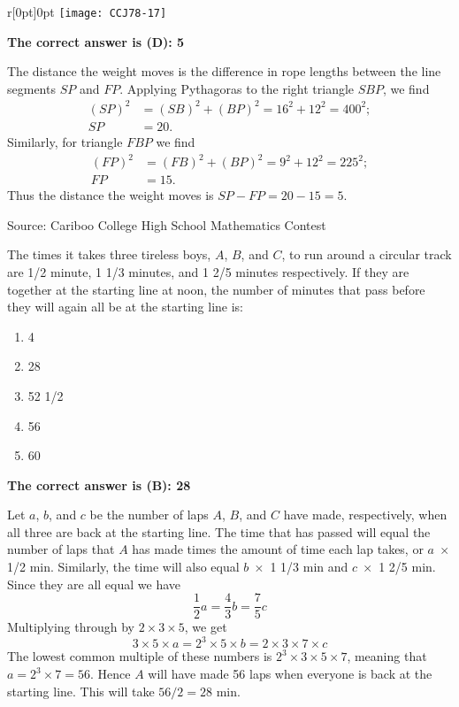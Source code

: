\documentclass{article}
\begin{document}
\begin{wrapfigure}{r}[0pt]{0pt}
	\texttt{[image: CCJ78-17]}
\end{wrapfigure}
\textbf{The correct answer is (D): 5}

The distance the weight moves is the difference in rope lengths between the line segments $SP$ and $FP$. Applying Pythagoras to the right triangle $SBP$, we find
\begin{align*}
(SP)^2 &= (SB)^2 + (BP)^2 = 16^2 + 12^2 = 400^2;\\
SP &= 20.
\end{align*}
Similarly, for triangle $FBP$ we find
\begin{align*}
(FP)^2 &= (FB)^2 + (BP)^2 = 9^2 + 12^2 = 225^2;\\
FP &= 15.
\end{align*}
Thus the distance the weight moves is $SP-FP=20-15=5$.

\vskip 1.5cm


\scriptsize
Source: Cariboo College High School Mathematics Contest

\normalsize
The times it takes three tireless boys, $A$, $B$, and $C$, to run around a circular track are 1/2 minute, 1 1/3 minutes, and 1 2/5 minutes respectively. If they are together at the starting line at noon, the number of minutes that pass before they will again all be at the starting line is:
\begin{enumerate}[noitemsep,topsep=0mm,leftmargin=*,widest=D,label=\Alph*)]
	\item 4
	\item 28
	\item 52 1/2
	\item 56
	\item 60
\end{enumerate}

\textbf{The correct answer is (B): 28}

Let $a$, $b$, and $c$ be the number of laps $A$, $B$, and $C$ have made, respectively, when all three are back at the starting line. The time that has passed will equal the number of laps that $A$ has made times the amount of time each lap takes, or $a\;\times$ 1/2 min. Similarly, the time will also equal $b\;\times$ 1 1/3 min and $c\;\times$ 1 2/5 min. Since they are all equal we have
\[
\frac{1}{2} a = \frac{4}{3} b = \frac{7}{5} c 
\]
Multiplying through by $2 \times 3 \times 5$, we get
\[
3 \times 5 \times a = 2^3 \times 5 \times b = 2 \times 3 \times 7 \times c
\]
The lowest common multiple of these numbers is $2^3 \times 3 \times 5 \times 7$, meaning that $a = 2^3 \times 7 = 56$. Hence $A$ will have made 56 laps when everyone is back at the starting line. This will take $56/2 = 28$ min.
\end{document}
